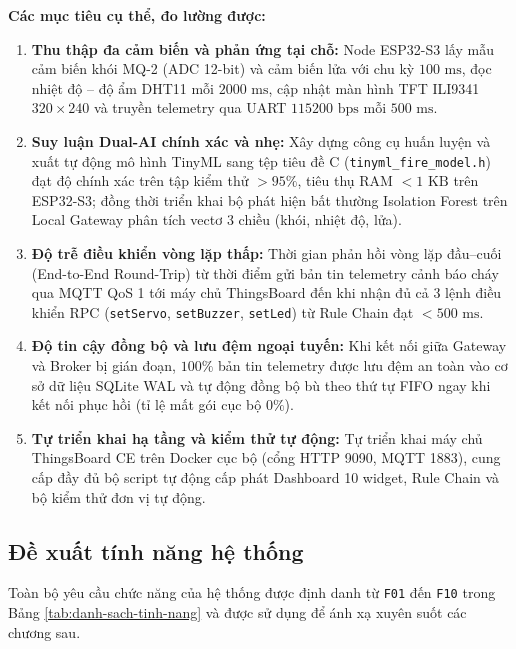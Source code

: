 \textbf{Các mục tiêu cụ thể, đo lường được:}
\begin{enumerate}[leftmargin=*, itemsep=3pt]
  \item \textbf{Thu thập đa cảm biến và phản ứng tại chỗ:} Node ESP32-S3 lấy mẫu cảm biến khói MQ-2 (ADC 12-bit) và cảm biến lửa với chu kỳ $100\text{ ms}$, đọc nhiệt độ -- độ ẩm DHT11 mỗi $2000\text{ ms}$, cập nhật màn hình TFT ILI9341 $320 \times 240$ và truyền telemetry qua UART $115200\text{ bps}$ mỗi $500\text{ ms}$.
  \item \textbf{Suy luận Dual-AI chính xác và nhẹ:} Xây dựng công cụ huấn luyện và xuất tự động mô hình TinyML sang tệp tiêu đề C (\texttt{tinyml\_fire\_model.h}) đạt độ chính xác trên tập kiểm thử $> 95\%$, tiêu thụ RAM $< 1\text{ KB}$ trên ESP32-S3; đồng thời triển khai bộ phát hiện bất thường Isolation Forest trên Local Gateway phân tích vectơ 3 chiều (khói, nhiệt độ, lửa).
  \item \textbf{Độ trễ điều khiển vòng lặp thấp:} Thời gian phản hồi vòng lặp đầu--cuối (End-to-End Round-Trip) từ thời điểm gửi bản tin telemetry cảnh báo cháy qua MQTT QoS 1 tới máy chủ ThingsBoard đến khi nhận đủ cả 3 lệnh điều khiển RPC (\texttt{setServo}, \texttt{setBuzzer}, \texttt{setLed}) từ Rule Chain đạt $< 500\text{ ms}$.
  \item \textbf{Độ tin cậy đồng bộ và lưu đệm ngoại tuyến:} Khi kết nối giữa Gateway và Broker bị gián đoạn, $100\%$ bản tin telemetry được lưu đệm an toàn vào cơ sở dữ liệu SQLite WAL và tự động đồng bộ bù theo thứ tự FIFO ngay khi kết nối phục hồi (tỉ lệ mất gói cục bộ $0\%$).
  \item \textbf{Tự triển khai hạ tầng và kiểm thử tự động:} Tự triển khai máy chủ ThingsBoard CE trên Docker cục bộ (cổng HTTP 9090, MQTT 1883), cung cấp đầy đủ bộ script tự động cấp phát Dashboard 10 widget, Rule Chain và bộ kiểm thử đơn vị tự động.
\end{enumerate}

\subsection{Đề xuất tính năng hệ thống}
\label{subsec:de-xuat-tinh-nang}

Toàn bộ yêu cầu chức năng của hệ thống được định danh từ \texttt{F01} đến \texttt{F10} trong Bảng \ref{tab:danh-sach-tinh-nang} và được sử dụng để ánh xạ xuyên suốt các chương sau.

